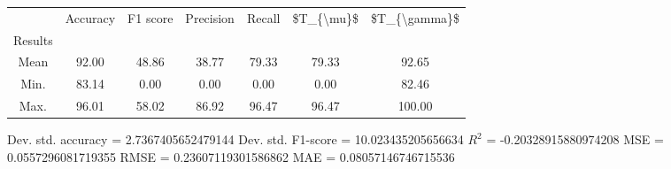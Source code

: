 \begin{tabular}{|c|c|c|c|c|c|c|}
\toprule
{} &  Accuracy &  F1 score &  Precision &  Recall &  \$T\_\{\textbackslash mu\}\$ &  \$T\_\{\textbackslash gamma\}\$ \\
Results &           &           &            &         &            &               \\
\hline
Mean    &     92.00 &     48.86 &      38.77 &   79.33 &      79.33 &         92.65 \\
Min.    &     83.14 &      0.00 &       0.00 &    0.00 &       0.00 &         82.46 \\
Max.    &     96.01 &     58.02 &      86.92 &   96.47 &      96.47 &        100.00 \\
\bottomrule
\end{tabular}

 Dev. std. accuracy = 2.7367405652479144
 Dev. std. F1-score = 10.023435205656634
 $R^2$ = -0.20328915880974208
 MSE = 0.0557296081719355
 RMSE = 0.23607119301586862
 MAE = 0.08057146746715536